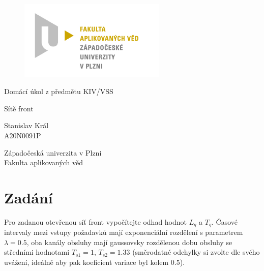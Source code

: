 \documentclass[12pt, a4paper]{article}
\let\oldsection\section
\renewcommand\section{\clearpage\oldsection}
\begin{document}
	\renewcommand{\lstlistingname}{Ukázka kódu}
	\renewcommand{\lstlistlistingname}{Seznam ukázek kódu}
    \begin{titlepage}

        \centering

        \vspace*{\baselineskip}
        \begin{figure}[H]
        \centering
        \includegraphics[width=7cm]{img/fav-logo.jpg}
        \end{figure}

        \vspace*{1\baselineskip}

        \vspace{0.75\baselineskip}

        \vspace{0.5\baselineskip}
        {Domácí úkol z předmětu KIV/VSS}

        {\LARGE\sc Sítě front\\}

        \vspace{4\baselineskip}

        \vspace{0.5\baselineskip}

        {\sc\Large Stanislav Král \\}
        \vspace{0.5\baselineskip}
        {A20N0091P}

        \vfill

        {\sc Západočeská univerzita v Plzni\\
        Fakulta aplikovaných věd}

    \end{titlepage}

    \tableofcontents
    \pagebreak

\section{Zadání}
Pro zadanou otevřenou síť front vypočítejte odhad hodnot $L_q$ a $T_q$.
Časové intervaly mezi vstupy požadavků mají exponenciální rozdělení s parametrem $\lambda = 0.5$, oba kanály obsluhy mají gaussovsky rozdělenou dobu obsluhy se středními hodnotami $T_{s1} = 1$, $T_{s2} = 1.33$ (směrodatné odchylky si zvolte dle svého uvážení, ideálně aby pak koeficient variace byl kolem 0.5).
\end{document}
